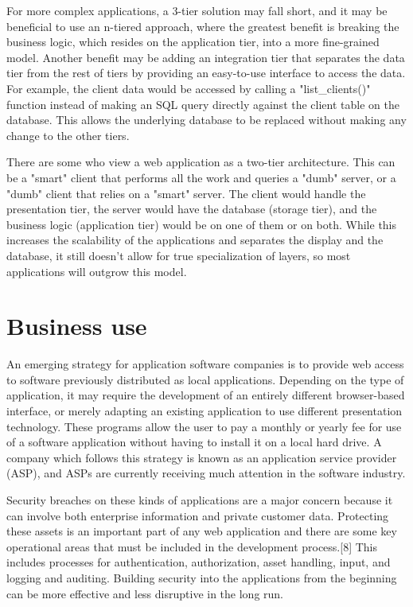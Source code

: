For more complex applications, a 3-tier solution may fall short, and it may be beneficial to use an n-tiered approach, where the greatest benefit is breaking the business logic, which resides on the application tier, into a more fine-grained model. Another benefit may be adding an integration tier that separates the data tier from the rest of tiers by providing an easy-to-use interface to access the data. For example, the client data would be accessed by calling a "list\_clients()" function instead of making an SQL query directly against the client table on the database. This allows the underlying database to be replaced without making any change to the other tiers.


There are some who view a web application as a two-tier architecture. This can be a "smart" client that performs all the work and queries a "dumb" server, or a "dumb" client that relies on a "smart" server. The client would handle the presentation tier, the server would have the database (storage tier), and the business logic (application tier) would be on one of them or on both. While this increases the scalability of the applications and separates the display and the database, it still doesn't allow for true specialization of layers, so most applications will outgrow this model.






\section{Business use}


An emerging strategy for application software companies is to provide web access to software previously distributed as local applications. Depending on the type of application, it may require the development of an entirely different browser-based interface, or merely adapting an existing application to use different presentation technology. These programs allow the user to pay a monthly or yearly fee for use of a software application without having to install it on a local hard drive. A company which follows this strategy is known as an application service provider (ASP), and ASPs are currently receiving much attention in the software industry.

Security breaches on these kinds of applications are a major concern because it can involve both enterprise information and private customer data. Protecting these assets is an important part of any web application and there are some key operational areas that must be included in the development process.[8] This includes processes for authentication, authorization, asset handling, input, and logging and auditing. Building security into the applications from the beginning can be more effective and less disruptive in the long run.

